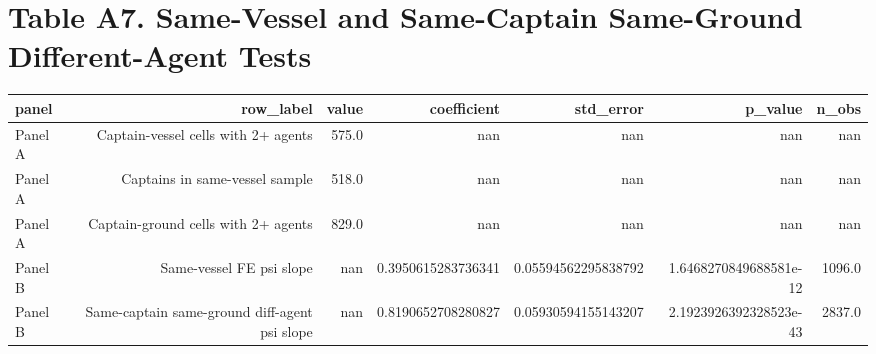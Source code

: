 \documentclass{article}
\begin{document}
\section*{Table A7. Same-Vessel and Same-Captain Same-Ground Different-Agent Tests}
\begin{tabular}{lrrrrrr}
\hline
panel & row_label & value & coefficient & std_error & p_value & n_obs \\
\hline
Panel A & Captain-vessel cells with 2+ agents & 575.0 & nan & nan & nan & nan \\
Panel A & Captains in same-vessel sample & 518.0 & nan & nan & nan & nan \\
Panel A & Captain-ground cells with 2+ agents & 829.0 & nan & nan & nan & nan \\
Panel B & Same-vessel FE psi slope & nan & 0.3950615283736341 & 0.05594562295838792 & 1.6468270849688581e-12 & 1096.0 \\
Panel B & Same-captain same-ground diff-agent psi slope & nan & 0.8190652708280827 & 0.05930594155143207 & 2.1923926392328523e-43 & 2837.0 \\
\hline
\end{tabular}
\end{document}
